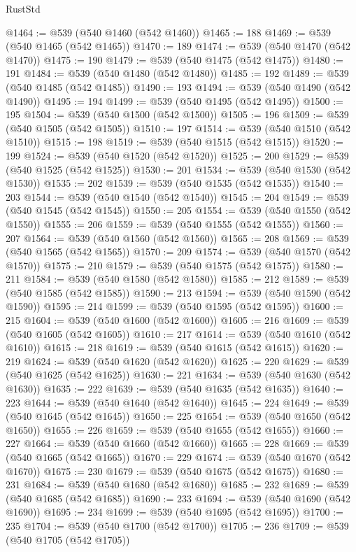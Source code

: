 \begin{lexlean}{RustStd}
\begin{coremodule}
{\begin{coremodule}
{{{{{{{{{{{{{{{{{{{{{{{{{{@1464 := @539 (@540 @1460 (@542 @1460))
@1465 := 188
@1469 := @539 (@540 @1465 (@542 @1465))
@1470 := 189
@1474 := @539 (@540 @1470 (@542 @1470))
@1475 := 190
@1479 := @539 (@540 @1475 (@542 @1475))
@1480 := 191
@1484 := @539 (@540 @1480 (@542 @1480))
@1485 := 192
@1489 := @539 (@540 @1485 (@542 @1485))
@1490 := 193
@1494 := @539 (@540 @1490 (@542 @1490))
@1495 := 194
@1499 := @539 (@540 @1495 (@542 @1495))
@1500 := 195
@1504 := @539 (@540 @1500 (@542 @1500))
@1505 := 196
@1509 := @539 (@540 @1505 (@542 @1505))
@1510 := 197
@1514 := @539 (@540 @1510 (@542 @1510))
@1515 := 198
@1519 := @539 (@540 @1515 (@542 @1515))
@1520 := 199
@1524 := @539 (@540 @1520 (@542 @1520))
@1525 := 200
@1529 := @539 (@540 @1525 (@542 @1525))
@1530 := 201
@1534 := @539 (@540 @1530 (@542 @1530))
@1535 := 202
@1539 := @539 (@540 @1535 (@542 @1535))
@1540 := 203
@1544 := @539 (@540 @1540 (@542 @1540))
@1545 := 204
@1549 := @539 (@540 @1545 (@542 @1545))
@1550 := 205
@1554 := @539 (@540 @1550 (@542 @1550))
@1555 := 206
@1559 := @539 (@540 @1555 (@542 @1555))
@1560 := 207
@1564 := @539 (@540 @1560 (@542 @1560))
@1565 := 208
@1569 := @539 (@540 @1565 (@542 @1565))
@1570 := 209
@1574 := @539 (@540 @1570 (@542 @1570))
@1575 := 210
@1579 := @539 (@540 @1575 (@542 @1575))
@1580 := 211
@1584 := @539 (@540 @1580 (@542 @1580))
@1585 := 212
@1589 := @539 (@540 @1585 (@542 @1585))
@1590 := 213
@1594 := @539 (@540 @1590 (@542 @1590))
@1595 := 214
@1599 := @539 (@540 @1595 (@542 @1595))
@1600 := 215
@1604 := @539 (@540 @1600 (@542 @1600))
@1605 := 216
@1609 := @539 (@540 @1605 (@542 @1605))
@1610 := 217
@1614 := @539 (@540 @1610 (@542 @1610))
@1615 := 218
@1619 := @539 (@540 @1615 (@542 @1615))
@1620 := 219
@1624 := @539 (@540 @1620 (@542 @1620))
@1625 := 220
@1629 := @539 (@540 @1625 (@542 @1625))
@1630 := 221
@1634 := @539 (@540 @1630 (@542 @1630))
@1635 := 222
@1639 := @539 (@540 @1635 (@542 @1635))
@1640 := 223
@1644 := @539 (@540 @1640 (@542 @1640))
@1645 := 224
@1649 := @539 (@540 @1645 (@542 @1645))
@1650 := 225
@1654 := @539 (@540 @1650 (@542 @1650))
@1655 := 226
@1659 := @539 (@540 @1655 (@542 @1655))
@1660 := 227
@1664 := @539 (@540 @1660 (@542 @1660))
@1665 := 228
@1669 := @539 (@540 @1665 (@542 @1665))
@1670 := 229
@1674 := @539 (@540 @1670 (@542 @1670))
@1675 := 230
@1679 := @539 (@540 @1675 (@542 @1675))
@1680 := 231
@1684 := @539 (@540 @1680 (@542 @1680))
@1685 := 232
@1689 := @539 (@540 @1685 (@542 @1685))
@1690 := 233
@1694 := @539 (@540 @1690 (@542 @1690))
@1695 := 234
@1699 := @539 (@540 @1695 (@542 @1695))
@1700 := 235
@1704 := @539 (@540 @1700 (@542 @1700))
@1705 := 236
@1709 := @539 (@540 @1705 (@542 @1705))
}}}}}}}}}}}}}}}}}}}}}}}}}}
\end{coremodule}}
\end{coremodule}
\end{lexlean}
